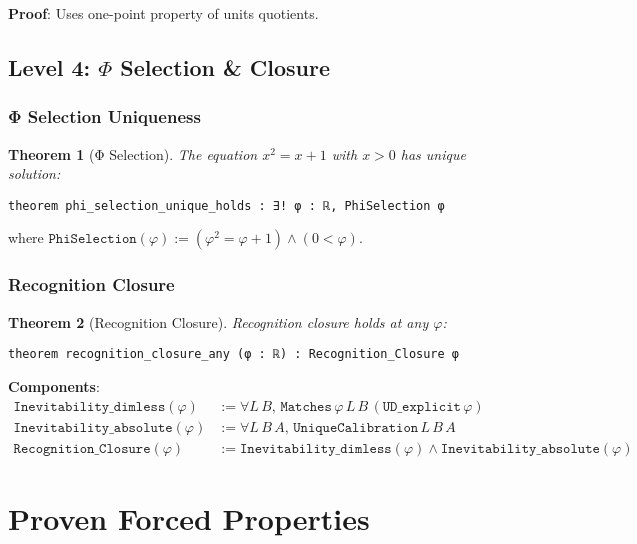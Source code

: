 \documentclass[11pt]{article}
\newtheorem{theorem}{Theorem}[section]
\theoremstyle{definition}
\theoremstyle{remark}
\begin{document}
\textbf{Proof}: Uses one-point property of units quotients.

\subsection{Level 4: $\Phi$ Selection \& Closure}

\subsubsection{Φ Selection Uniqueness}

\begin{theorem}[Φ Selection]
The equation $x^2 = x + 1$ with $x > 0$ has unique solution:
\begin{lstlisting}[language=lean]
theorem phi_selection_unique_holds : ∃! φ : ℝ, PhiSelection φ
\end{lstlisting}
\end{theorem}

where $\texttt{PhiSelection}(\varphi) := (\varphi^2 = \varphi + 1) \land (0 < \varphi)$.

\subsubsection{Recognition Closure}

\begin{theorem}[Recognition Closure]
Recognition closure holds at any $\varphi$:
\begin{lstlisting}[language=lean]
theorem recognition_closure_any (φ : ℝ) : Recognition_Closure φ
\end{lstlisting}
\end{theorem}

\textbf{Components}:
\begin{align*}
\texttt{Inevitability\_dimless}(\varphi) &:= \forall L\, B,\, \texttt{Matches}\, \varphi\, L\, B\, (\texttt{UD\_explicit}\, \varphi) \\
\texttt{Inevitability\_absolute}(\varphi) &:= \forall L\, B\, A,\, \texttt{UniqueCalibration}\, L\, B\, A \\
\texttt{Recognition\_Closure}(\varphi) &:= \texttt{Inevitability\_dimless}(\varphi) \land \texttt{Inevitability\_absolute}(\varphi)
\end{align*}

\section{Proven Forced Properties}
\end{document}
